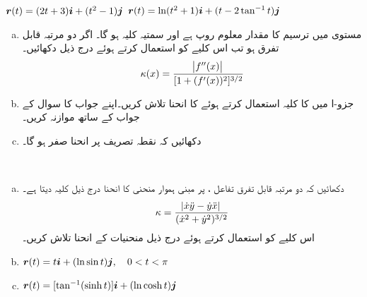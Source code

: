 ${{\boldsymbol{r}}}(t)=(2t+3){\boldsymbol{i}}+(t^2-1){\boldsymbol{j}}$
${{\boldsymbol{r}}}(t)=\ln (t^2+1){\boldsymbol{i}}+(t-2\tan^{-1}t){\boldsymbol{j}}$
\\
\begin{enumerate}[a.]
\item
مستوی  میں ترسیم   کا مقدار معلوم روپ  ہے اور سمتیہ کلیہ  ہو گا۔ اگر  دو مرتبہ  قابل تفرق ہو تب اس کلیے  کو استعمال کرتے ہوئے  درج ذیل دکھائیں۔
\begin{align*}
\kappa(x)=\frac{\abs{f''(x)}}{[1+(f'(x))^2]^{3/2}}
\end{align*} 
\item
جزو-ا میں  کا کلیہ  استعمال کرتے ہوئے   کا انحنا تلاش کریں۔اپنے جواب کا سوال  کے جواب کے ساتھ موازنہ کریں۔
\item
دکھائیں کہ نقطہ  تصریف پر انحنا صفر ہو گا۔ 
\end{enumerate}
\\
\begin{enumerate}[a.]
\item
دکھائیں کہ دو مرتبہ  قابل تفرق تفاعل ،  پر مبنی ہموار منحنی   کا انحنا درج ذیل کلیہ دیتا ہے۔
\begin{align*}
\kappa=\frac{\abs{\dot{x}\ddot{y}-\dot{y}\ddot{x}}}{(\dot{x}^2+\dot{y}^2)^{3/2}}
\end{align*}
اس کلیے  کو استعمال کرتے ہوئے درج ذیل منحنیات کے انحنا تلاش کریں۔
\item
${{\boldsymbol{r}}}(t)=t{\boldsymbol{i}}+(\ln\sin t){\boldsymbol{j}},\quad 0<t<\pi$
\item
${{\boldsymbol{r}}}(t)=[\tan^{-1}(\sinh t)]{\boldsymbol{i}}+(\ln \cosh t){\boldsymbol{j}}$
\end{enumerate}
\\
